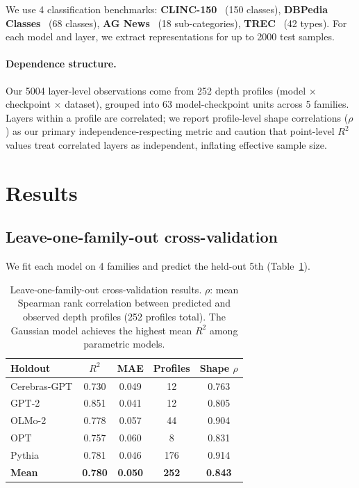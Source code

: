 \documentclass{article}
\begin{document}
We use 4 classification benchmarks:
\textbf{CLINC-150}~\citep{larson2019clinc} (150 classes),
\textbf{DBPedia Classes}~\citep{lehmann2015dbpedia} (68 classes),
\textbf{AG News}~\citep{zhang2015yahoo} (18 sub-categories),
\textbf{TREC}~\citep{voorhees2000trec} (42 types).
For each model and layer, we extract representations for up to 2000 test samples.

\paragraph{Dependence structure.}
Our 5004 layer-level observations come from 252 depth profiles (model $\times$ checkpoint $\times$ dataset), grouped into 63 model-checkpoint units across 5 families. Layers within a profile are correlated; we report profile-level shape correlations ($\rho$) as our primary independence-respecting metric and caution that point-level $R^2$ values treat correlated layers as independent, inflating effective sample size.

\section{Results}
\label{sec:experiments}

\subsection{Leave-one-family-out cross-validation}

We fit each model on 4 families and predict the held-out 5th (Table~\ref{tab:lofo}).

\begin{table}[t]
\centering
\caption{Leave-one-family-out cross-validation results. $\rho$: mean Spearman rank correlation between predicted and observed depth profiles (252 profiles total). The Gaussian model achieves the highest mean $R^2$ among parametric models.}
\label{tab:lofo}
\begin{tabular}{lcccc}
\toprule
Holdout & $R^2$ & MAE & Profiles & Shape $\rho$ \\
\midrule
Cerebras-GPT & 0.730 & 0.049 & 12 & 0.763 \\
GPT-2 & 0.851 & 0.041 & 12 & 0.805 \\
OLMo-2 & 0.778 & 0.057 & 44 & 0.904 \\
OPT & 0.757 & 0.060 & 8 & 0.831 \\
Pythia & 0.781 & 0.046 & 176 & 0.914 \\
\midrule
\textbf{Mean} & \textbf{0.780} & \textbf{0.050} & \textbf{252} & \textbf{0.843} \\
\bottomrule
\end{tabular}
\end{table}
\end{document}
